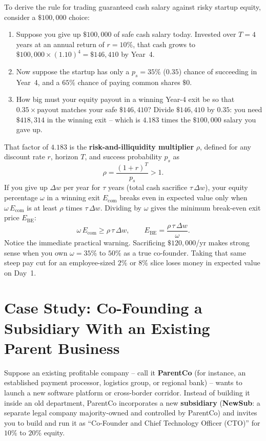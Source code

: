 To derive the rule for trading guaranteed cash salary against risky startup equity, consider a $\$100{,}000$ choice:
\begin{enumerate}
  \item Suppose you give up $\$100{,}000$ of safe cash salary today. Invested over $T = 4$ years at an annual return of $r = 10\%$, that cash grows to $\$100{,}000 \times (1.10)^4 = \$146{,}410$ by Year~4.
  \item Now suppose the startup has only a $p_s = 35\%$ ($0.35$) chance of succeeding in Year~4, and a $65\%$ chance of paying common shares $\$0$.
  \item How big must your equity payout in a winning Year-4 exit be so that $0.35 \times \text{payout}$ matches your safe $\$146{,}410$? Divide $\$146{,}410$ by $0.35$: you need $\$418{,}314$ in the winning exit -- which is $4.183$ times the $\$100{,}000$ salary you gave up.
\end{enumerate}

That factor of $4.183$ is the \textbf{risk-and-illiquidity multiplier} $\rho$, defined for any discount rate $r$, horizon $T$, and success probability $p_s$ as
\begin{equation}\label{eq:risk-multiplier}
  \rho = \frac{(1 + r)^T}{p_s} > 1.
\end{equation}
If you give up $\Delta w$ per year for $\tau$ years (total cash sacrifice $\tau\,\Delta w$), your equity percentage $\omega$ in a winning exit $E_{\text{com}}$ breaks even in expected value only when $\omega\,E_{\text{com}}$ is at least $\rho$ times $\tau\,\Delta w$. Dividing by $\omega$ gives the minimum break-even exit price $E_{\text{BE}}$:
\begin{equation}\label{eq:salary-equity-tradeoff}
  \omega\,E_{\text{com}} \ge \rho\,\tau\,\Delta w,
  \qquad
  E_{\text{BE}} = \frac{\rho\,\tau\,\Delta w}{\omega}.
\end{equation}
Notice the immediate practical warning. Sacrificing $\$120{,}000$/yr makes strong sense when you own $\omega = 35\%$ to $50\%$ as a true co-founder. Taking that same steep pay cut for an employee-sized $2\%$ or $8\%$ slice loses money in expected value on Day~1.

\section{Case Study: Co-Founding a Subsidiary With an Existing Parent Business}
\label{sec:existing-business-contracts}

Suppose an existing profitable company -- call it \textbf{ParentCo} (for instance, an established payment processor, logistics group, or regional bank) -- wants to launch a new software platform or cross-border corridor. Instead of building it inside an old department, ParentCo incorporates a new \textbf{subsidiary} (\textbf{NewSub}: a separate legal company majority-owned and controlled by ParentCo) and invites you to build and run it as ``Co-Founder and Chief Technology Officer (CTO)'' for $10\%$ to $20\%$ equity.

